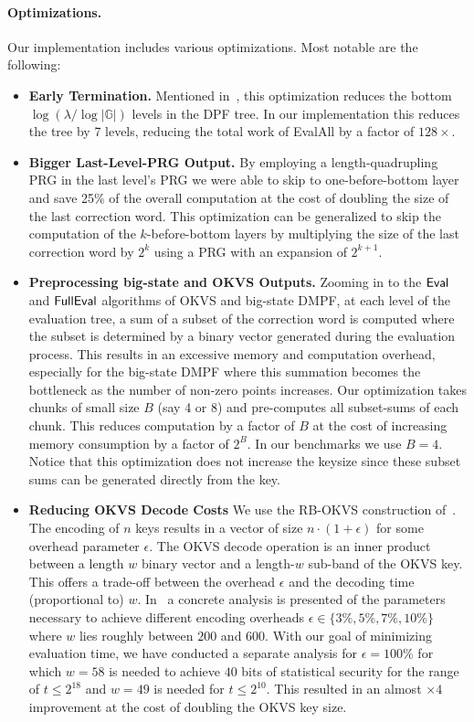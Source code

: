 \paragraph{Optimizations.} Our implementation includes various optimizations. Most notable are the following:
\begin{itemize}
    \item {\bf Early Termination.} Mentioned in~\cite{BoyGilIsh16}, this optimization reduces the bottom $\log (\lambda / \log |\mathbb{G}|)$ levels in the DPF tree. In our implementation this reduces the tree by 7 levels, reducing the total work of EvalAll by a factor of $128\times$.
    \item {\bf Bigger Last-Level-PRG Output.} By employing a length-quadrupling PRG in the last level's PRG we were able to skip to one-before-bottom layer and save 25\% of the overall computation at the cost of doubling the size of the last correction word. This optimization can be generalized to skip the computation of the $k$-before-bottom layers by multiplying the size of the last correction word by $2^k$ using a PRG with an expansion of $2^{k+1}$.
    \item {\bf Preprocessing big-state and OKVS Outputs.} Zooming in to the ${\sf Eval}$ and ${\sf FullEval}$ algorithms of OKVS and big-state DMPF, at each level of the evaluation tree, a sum of a subset of the correction word is computed where the subset is determined by a binary vector generated during the evaluation process. This results in an excessive memory and computation overhead, especially for the big-state DMPF where this summation becomes the bottleneck as the number of non-zero points increases. Our optimization takes chunks of small size $B$ (say 4 or 8) and pre-computes all subset-sums of each chunk. This reduces computation by a factor of $B$ at the cost of increasing memory consumption by a factor of $2^B$. In our benchmarks we use $B=4$.
    Notice that this optimization does not increase the keysize since these subset sums can be generated directly from the key. 
    \item {\bf Reducing OKVS Decode Costs} We use the RB-OKVS construction of~\cite{cryptoeprint:2023/903}. The encoding of $n$ keys results in a vector of size $n\cdot (1+\epsilon)$ for some overhead parameter $\epsilon$. The OKVS decode operation is an inner product between a length $w$ binary vector and a length-$w$ sub-band of the OKVS key. This offers a trade-off between the overhead $\epsilon$ and the decoding time (proportional to) $w$. In~\cite{cryptoeprint:2023/903} a concrete analysis is presented of the parameters necessary to achieve different encoding overheads $\epsilon \in \{3\%,5\%,7\%,10\%\}$ where $w$ lies roughly between $200$ and $600$. With our goal of minimizing evaluation time, we have conducted a separate analysis for $\epsilon=100\%$ for which $w=58$ is needed to achieve $40$ bits of statistical security for the range of $t\leq 2^{18}$ and $w=49$ is needed for $t\leq 2^{10}$. This resulted in an almost $\times 4$ improvement at the cost of doubling the OKVS key size.  
\end{itemize}

